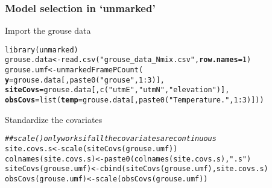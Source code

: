 \documentclass[color=usenames,dvipsnames]{beamer}\usepackage[]{graphicx}\usepackage[]{xcolor}
\makeatletter
\newcommand{\hlnum}[1]{\textcolor[rgb]{0.69,0.494,0}{#1}}%
\newcommand{\hlsng}[1]{\textcolor[rgb]{0.749,0.012,0.012}{#1}}%
\newcommand{\hlcom}[1]{\textcolor[rgb]{0.514,0.506,0.514}{\textit{#1}}}%
\newcommand{\hlopt}[1]{\textcolor[rgb]{0,0,0}{#1}}%
\newcommand{\hldef}[1]{\textcolor[rgb]{0,0,0}{#1}}%
\newcommand{\hlkwb}[1]{\textcolor[rgb]{0,0.341,0.682}{#1}}%
\newcommand{\hlkwc}[1]{\textcolor[rgb]{0,0,0}{\textbf{#1}}}%
\newcommand{\hlkwd}[1]{\textcolor[rgb]{0.004,0.004,0.506}{#1}}%
\newenvironment{kframe}{%
 \def\at@end@of@kframe{}%
 \ifinner\ifhmode%
  \def\at@end@of@kframe{\end{minipage}}%
  \begin{minipage}{\columnwidth}%
 \fi\fi%
 \def\FrameCommand##1{\hskip\@totalleftmargin \hskip-\fboxsep
 \colorbox{shadecolor}{##1}\hskip-\fboxsep
     \hskip-\linewidth \hskip-\@totalleftmargin \hskip\columnwidth}%
 \MakeFramed {\advance\hsize-\width
   \@totalleftmargin\z@ \linewidth\hsize
   \@setminipage}}%
 {\par\unskip\endMakeFramed%
 \at@end@of@kframe}
\newenvironment{knitrout}{}{} %
\newcommand{\inr}[1]{\colorbox{inlinecolor}{\texttt{#1}}}
\makeatother
\begin{document}
\begin{frame}[fragile]
  \frametitle{Model selection in `unmarked'}
  \small
  Import the grouse data
  \vspace{-6pt}
\begin{knitrout}\footnotesize
{}\color{fgcolor}\begin{kframe}
\begin{alltt}
\hlkwd{library}\hldef{(unmarked)}
\hldef{grouse.data} \hlkwb{<-} \hlkwd{read.csv}\hldef{(}\hlsng{"grouse_data_Nmix.csv"}\hldef{,} \hlkwc{row.names}\hldef{=}\hlnum{1}\hldef{)}
\hldef{grouse.umf} \hlkwb{<-} \hlkwd{unmarkedFramePCount}\hldef{(}
    \hlkwc{y}\hldef{=grouse.data[,}\hlkwd{paste0}\hldef{(}\hlsng{"grouse"}\hldef{,}\hlnum{1}\hlopt{:}\hlnum{3}\hldef{)],}
    \hlkwc{siteCovs}\hldef{=grouse.data[,}\hlkwd{c}\hldef{(}\hlsng{"utmE"}\hldef{,}\hlsng{"utmN"}\hldef{,}\hlsng{"elevation"}\hldef{)],}
    \hlkwc{obsCovs}\hldef{=}\hlkwd{list}\hldef{(}\hlkwc{temp}\hldef{=grouse.data[,}\hlkwd{paste0}\hldef{(}\hlsng{"Temperature."}\hldef{,}\hlnum{1}\hlopt{:}\hlnum{3}\hldef{)]))}
\end{alltt}
\end{kframe}
\end{knitrout}
\pause
\vfill
Standardize the covariates
  \vspace{-6pt}
\begin{knitrout}\footnotesize
{}\color{fgcolor}\begin{kframe}
\begin{alltt}
\hlcom{## scale() only works if all the covariates are continuous  }
\hldef{site.covs.s} \hlkwb{<-} \hlkwd{scale}\hldef{(}\hlkwd{siteCovs}\hldef{(grouse.umf))}
\hlkwd{colnames}\hldef{(site.covs.s)} \hlkwb{<-} \hlkwd{paste0}\hldef{(}\hlkwd{colnames}\hldef{(site.covs.s),} \hlsng{".s"}\hldef{)}
\hlkwd{siteCovs}\hldef{(grouse.umf)} \hlkwb{<-} \hlkwd{cbind}\hldef{(}\hlkwd{siteCovs}\hldef{(grouse.umf), site.covs.s)}
\hlkwd{obsCovs}\hldef{(grouse.umf)} \hlkwb{<-} \hlkwd{scale}\hldef{(}\hlkwd{obsCovs}\hldef{(grouse.umf))}
\end{alltt}
\end{kframe}
\end{knitrout}
\end{frame}
\end{document}
